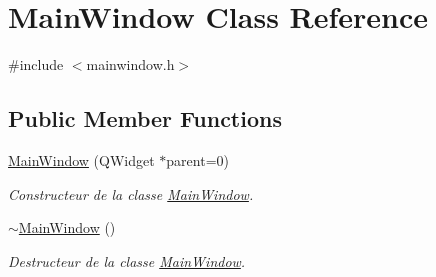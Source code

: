 \hypertarget{class_main_window}{\section{Main\-Window Class Reference}
\label{class_main_window}
}


{\ttfamily \#include $<$mainwindow.\-h$>$}

\subsection*{Public Member Functions}
\begin{DoxyCompactItemize}
\item 
\hyperlink{class_main_window_a8b244be8b7b7db1b08de2a2acb9409db}{Main\-Window} (Q\-Widget $\ast$parent=0)
\begin{DoxyCompactList}\small\item\em Constructeur de la classe \hyperlink{class_main_window}{Main\-Window}. \end{DoxyCompactList}\item 
\hyperlink{class_main_window_ae98d00a93bc118200eeef9f9bba1dba7}{$\sim$\-Main\-Window} ()
\begin{DoxyCompactList}\small\item\em Destructeur de la classe \hyperlink{class_main_window}{Main\-Window}. \end{DoxyCompactList}\end{DoxyCompactItemize}
